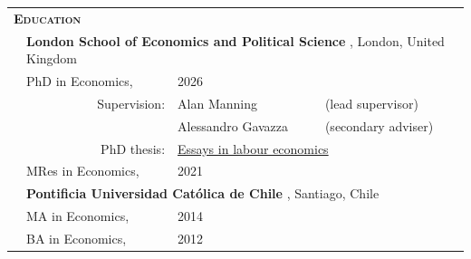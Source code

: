 \begin{tabular}{llll}

	\multicolumn{3}{l}{
		\large
		\textbf{%
			\textsc{%
				Education
			}
		}
	}
	\\[2ex]

	\indent
	&
	\multicolumn{3}{l}{
		\textbf{%
			London School of Economics and Political Science%
		}%
		,
		London,
		United Kingdom
	}
	\\[.5ex]
	
	  
	& PhD in Economics,
	& 2026
	& %
	\\%
	
	& \multicolumn{1}{r}{\footnotesize Supervision:}
	& \footnotesize Alan Manning
	& \scriptsize (lead supervisor)
	\\[-.5ex]
	&
	& \footnotesize Alessandro Gavazza
	& \scriptsize (secondary adviser)
	\\%
	& \multicolumn{1}{r}{\footnotesize PhD thesis:}
	& \multicolumn{2}{l}{\footnotesize  \href{https://doi.org/10.21953/researchonline.lse.ac.uk.00140610}{Essays in labour economics}}
	\\[.5ex]
		  
	& MRes in Economics,
	& 2021
	\\[1.1em]
	
	&
	\multicolumn{3}{l}{
		\textbf{%
			Pontificia Universidad Cat\'olica de Chile%
		}%
		,
		Santiago,
		Chile
	}
	\\[.5ex]
	
	  
	& MA in Economics,
	& 2014
	\\
	
	  
	& BA in Economics,
	& 2012
	
\end{tabular}